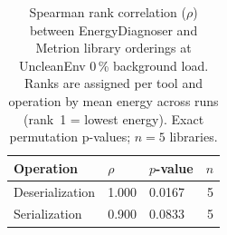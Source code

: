 \begin{table}[ht]
\centering
\caption{Spearman rank correlation (\( \rho \)) between EnergyDiagnoser and Metrion library orderings at UncleanEnv 0\,\% background load. Ranks are assigned per tool and operation by mean energy across runs (rank~1 = lowest energy). Exact permutation p-values; \( n = 5 \) libraries.} 
\label{tab:spearman_rho}
\begin{tabular}{lllr}
  \toprule
Operation & $\rho$ & $p$-value & $n$ \\ 
  \midrule
Deserialization & 1.000 & 0.0167 &   5 \\ 
  Serialization & 0.900 & 0.0833 &   5 \\ 
   \bottomrule
\end{tabular}
\end{table}
